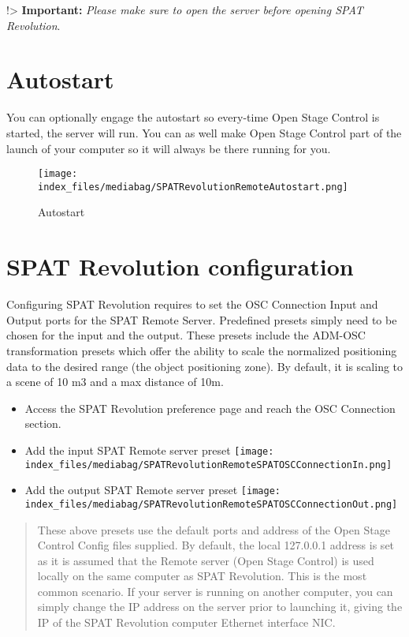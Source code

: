 \documentclass[
  letterpaper,
  DIV=11,
  numbers=noendperiod]{scrreport}
\begin{document}
!\textgreater{} \textbf{Important: } \emph{Please make sure to open the
server before opening SPAT Revolution}.

\hypertarget{autostart}{%
\section{Autostart}\label{autostart}}

You can optionally engage the autostart so every-time Open Stage Control
is started, the server will run. You can as well make Open Stage Control
part of the launch of your computer so it will always be there running
for you.

\begin{figure}

{\centering \texttt{[image: index\_files/mediabag/SPATRevolutionRemoteAutostart.png]}

}

\caption{Autostart}

\end{figure}

\hypertarget{spat-revolution-configuration}{%
\section{SPAT Revolution
configuration}\label{spat-revolution-configuration}}

Configuring SPAT Revolution requires to set the OSC Connection Input and
Output ports for the SPAT Remote Server. Predefined presets simply need
to be chosen for the input and the output. These presets include the
ADM-OSC transformation presets which offer the ability to scale the
normalized positioning data to the desired range (the object positioning
zone). By default, it is scaling to a scene of 10 m3 and a max distance
of 10m.

\begin{itemize}
\item
  Access the SPAT Revolution preference page and reach the OSC
  Connection section.
\item
  Add the input \textbar{} SPAT Remote server preset
  \texttt{[image: index\_files/mediabag/SPATRevolutionRemoteSPATOSCConnectionIn.png]}
\item
  Add the output\textbar{} SPAT Remote server preset
  \texttt{[image: index\_files/mediabag/SPATRevolutionRemoteSPATOSCConnectionOut.png]}
\end{itemize}

\begin{quote}
These above presets use the default ports and address of the Open Stage
Control Config files supplied. By default, the local 127.0.0.1 address
is set as it is assumed that the Remote server (Open Stage Control) is
used locally on the same computer as SPAT Revolution. This is the most
common scenario. If your server is running on another computer, you can
simply change the IP address on the server prior to launching it, giving
the IP of the SPAT Revolution computer Ethernet interface NIC.
\end{quote}
\end{document}
